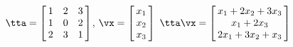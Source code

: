{$\tta = \left[\hskip -3pt \begin{array}{ccc} 1&2&3\\  1&0&2
\\  2&3&1\end{array}\hskip -3pt \right]$,\quad  
$\vx = \left[\hskip -3pt \begin{array}{c} x_1\\  x_2\\  
x_3\end{array}\hskip -3pt \right] $}
{$\tta\vx= \left[\hskip -3pt \begin{array}{c} x_1+2x_2+3x_3\\  x_1+2x_3\\  2x_1+3x_2+x_3\end{array}\hskip -3pt \right] $
}
 
 

 

 

